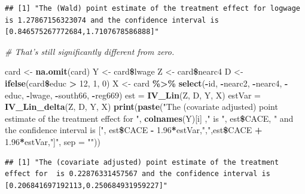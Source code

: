 \documentclass[]{article}
\newenvironment{Shaded}{\begin{snugshade}}{\end{snugshade}}
\newcommand{\KeywordTok}[1]{\textcolor[rgb]{0.13,0.29,0.53}{\textbf{#1}}}
\newcommand{\DataTypeTok}[1]{\textcolor[rgb]{0.13,0.29,0.53}{#1}}
\newcommand{\DecValTok}[1]{\textcolor[rgb]{0.00,0.00,0.81}{#1}}
\newcommand{\FloatTok}[1]{\textcolor[rgb]{0.00,0.00,0.81}{#1}}
\newcommand{\StringTok}[1]{\textcolor[rgb]{0.31,0.60,0.02}{#1}}
\newcommand{\CommentTok}[1]{\textcolor[rgb]{0.56,0.35,0.01}{\textit{#1}}}
\newcommand{\OperatorTok}[1]{\textcolor[rgb]{0.81,0.36,0.00}{\textbf{#1}}}
\newcommand{\NormalTok}[1]{#1}
\begin{document}
\begin{verbatim}
## [1] "The (Wald) point estimate of the treatment effect for logwage is 1.27867156323074 and the confidence interval is [0.846575267772684,1.7107678586888]"
\end{verbatim}

\begin{Shaded}
\begin{Highlighting}[]
\CommentTok{# That's still significantly different from zero.}
\end{Highlighting}
\end{Shaded}

\begin{Shaded}
\begin{Highlighting}[]
\NormalTok{card <-}\StringTok{ }\KeywordTok{na.omit}\NormalTok{(card)}
\NormalTok{Y <-}\StringTok{ }\NormalTok{card}\OperatorTok{\$}\NormalTok{lwage}
\NormalTok{Z <-}\StringTok{ }\NormalTok{card}\OperatorTok{\$}\NormalTok{nearc4}
\NormalTok{D <-}\StringTok{ }\KeywordTok{ifelse}\NormalTok{(card}\OperatorTok{\$}\NormalTok{educ }\OperatorTok{>}\StringTok{ }\DecValTok{12}\NormalTok{, }\DecValTok{1}\NormalTok{, }\DecValTok{0}\NormalTok{)}
\NormalTok{X <-}\StringTok{ }\NormalTok{card }\OperatorTok{\%>\%}\StringTok{ }\KeywordTok{select}\NormalTok{(}\OperatorTok{-}\NormalTok{id, }\OperatorTok{-}\NormalTok{nearc2, }\OperatorTok{-}\NormalTok{nearc4, }\OperatorTok{-}\NormalTok{educ, }\OperatorTok{-}\NormalTok{lwage, }\OperatorTok{-}\NormalTok{south66, }\OperatorTok{-}\NormalTok{reg669)}
\NormalTok{est =}\StringTok{ }\KeywordTok{IV_Lin}\NormalTok{(Z, D, Y, X)}
\NormalTok{estVar =}\StringTok{ }\KeywordTok{IV_Lin_delta}\NormalTok{(Z, D, Y, X)}
\KeywordTok{print}\NormalTok{(}\KeywordTok{paste}\NormalTok{(}\StringTok{"The (covariate adjusted) point estimate of the treatment effect for "}\NormalTok{, }\KeywordTok{colnames}\NormalTok{(Y)[i] ,}\StringTok{" is "}\NormalTok{, est}\OperatorTok{\$}\NormalTok{CACE, }\StringTok{" and the confidence interval is ["}\NormalTok{, est}\OperatorTok{\$}\NormalTok{CACE }\OperatorTok{-}\StringTok{ }\FloatTok{1.96}\OperatorTok{*}\NormalTok{estVar,}\StringTok{","}\NormalTok{,est}\OperatorTok{\$}\NormalTok{CACE }\OperatorTok{+}\StringTok{ }\FloatTok{1.96}\OperatorTok{*}\NormalTok{estVar,}\StringTok{"]"}\NormalTok{, }\DataTypeTok{sep =} \StringTok{""}\NormalTok{))}
\end{Highlighting}
\end{Shaded}

\begin{verbatim}
## [1] "The (covariate adjusted) point estimate of the treatment effect for  is 0.22876331457567 and the confidence interval is [0.206841697192113,0.250684931959227]"
\end{verbatim}
\end{document}
